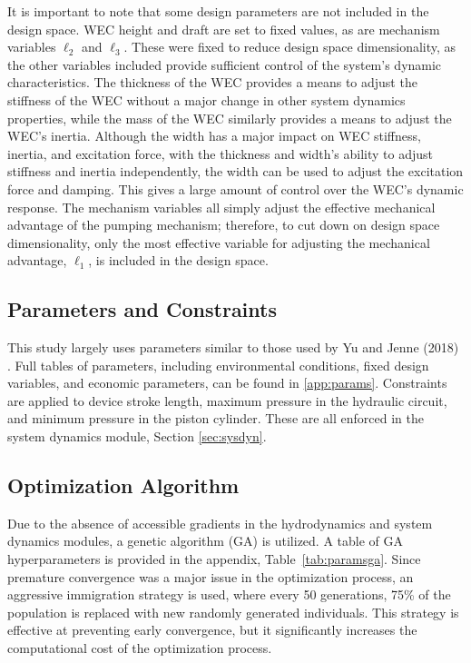 \documentclass[a4paper,12pt]{elsarticle}
\begin{document}
It is important to note that some design parameters are not included in the design space. WEC height and draft are set to fixed values, as are mechanism variables $\ell_2$ and $\ell_3$. These were fixed to reduce design space dimensionality, as the other variables included provide sufficient control of the system's dynamic characteristics. The thickness of the WEC provides a means to adjust the  stiffness of the WEC without a major change in other system dynamics properties, while the mass of the WEC similarly provides a means to adjust the WEC's inertia. Although the width has a major impact on WEC stiffness, inertia, and excitation force, with the thickness and width's ability to adjust stiffness and inertia independently, the width can be used to adjust the excitation force and damping. This gives a large amount of control over the WEC's dynamic response. The mechanism variables all simply adjust the effective mechanical advantage of the pumping mechanism; therefore, to cut down on design space dimensionality, only the most effective variable for adjusting the mechanical advantage, $\ell_1$, is included in the design space.

\subsection{Parameters and Constraints}
This study largely uses parameters similar to those used by Yu and Jenne (2018) \cite{Yu2018}. Full tables of parameters, including environmental conditions, fixed design variables, and economic parameters, can be found in \ref{app:params}. Constraints are applied to device stroke length, maximum pressure in the hydraulic circuit, and minimum pressure in the piston cylinder. These are all enforced in the system dynamics module, Section \ref{sec:sysdyn}.

\subsection{Optimization Algorithm}
Due to the absence of accessible gradients in the hydrodynamics and system dynamics modules, a genetic algorithm (GA) is utilized. A table of GA hyperparameters is provided in the appendix, Table~\ref{tab:paramsga}. Since premature convergence was a major issue in the optimization process, an aggressive immigration strategy is used, where every 50 generations, 75\% of the population is replaced with new randomly generated individuals. This strategy is effective at preventing early convergence, but it significantly increases the computational cost of the optimization process. 
\end{document}
